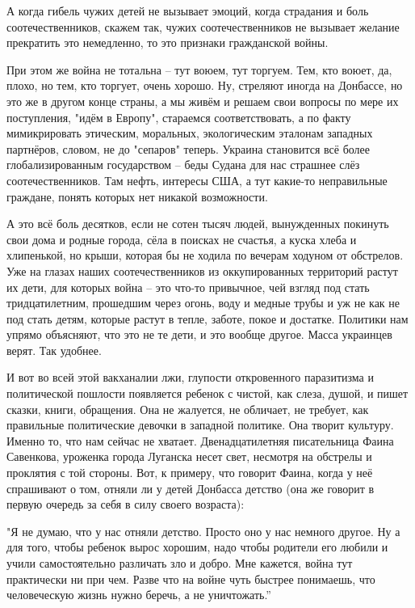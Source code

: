 А когда гибель чужих детей не вызывает эмоций, когда страдания и боль
соотечественников, скажем так, чужих соотечественников не вызывает желание
прекратить это немедленно, то это признаки гражданской войны. 

При этом же война не тотальна – тут воюем, тут торгуем. Тем, кто воюет, да,
плохо, но тем, кто торгует, очень хорошо.  Ну, стреляют иногда на Донбассе, но
это же в другом конце страны, а мы живём и решаем свои вопросы по мере их
поступления, "идём в Европу", стараемся соответствовать, а по факту
мимикрировать этическим, моральных, экологическим эталонам западных партнёров,
словом, не до "сепаров" теперь. Украина становится всё более глобализированным
государством – беды Судана для нас страшнее слёз соотечественников. Там нефть,
интересы США, а тут какие-то неправильные граждане, понять которых нет никакой
возможности. 

А это всё боль десятков, если не сотен тысяч людей, вынужденных покинуть свои
дома и родные города, сёла в поисках не счастья, а куска хлеба и хлипенькой, но
крыши, которая бы не ходила по вечерам ходуном от обстрелов. Уже на глазах
наших соотечественников из оккупированных территорий растут их дети, для
которых война – это что-то привычное, чей взгляд под стать тридцатилетним,
прошедшим через огонь, воду и медные трубы и уж не как не под стать детям,
которые растут в тепле, заботе, покое и достатке. Политики нам упрямо
объясняют, что это не те дети, и это вообще другое. Масса украинцев верят. Так
удобнее. 

И вот во всей этой вакханалии лжи, глупости откровенного паразитизма и
политической пошлости появляется ребенок с чистой, как слеза, душой, и пишет
сказки, книги, обращения. Она не жалуется, не обличает, не требует, как
правильные политические девочки в западной политике. Она творит культуру.
Именно то, что нам сейчас не хватает. Двенадцатилетняя писательница Фаина
Савенкова, уроженка города Луганска несет свет, несмотря на обстрелы и
проклятия с той стороны. Вот, к примеру, что говорит Фаина, когда у неё
спрашивают о том, отняли ли у детей Донбасса детство (она же говорит в первую
очередь за себя в силу своего возраста): 

"Я не думаю, что у нас отняли детство. Просто оно у нас немного другое. Ну а
для того, чтобы ребенок вырос хорошим, надо чтобы родители его любили и учили
самостоятельно различать зло и добро. Мне кажется, война тут практически ни при
чем. Разве что на войне чуть быстрее понимаешь, что человеческую жизнь нужно
беречь, а не уничтожать.”

